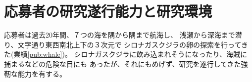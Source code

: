 
\section{応募者の研究遂行能力と研究環境}

	応募者は過去20年間、７つの海を隅から隅まで航海し、
	浅瀬から深海まで潜り、文字通り東西南北上下の３次元で
	シロナガスクジラの卵の探索を行ってきた(業績\ref{pub:whale})。
	シロナガスクジラに飲み込まれそうになったり、海賊に捕まるなどの危険な目にも
	あったが、それにもめげず、研究を遂行してきた強靭な能力を有する。

\PapersInstructions	%




